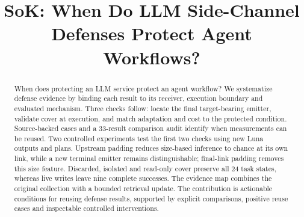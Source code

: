 \documentclass[conference,compsoc]{IEEEtran}
\title{SoK: When Do LLM Side-Channel Defenses Protect Agent Workflows?}
\author{}
\begin{document}
\maketitle

\begin{abstract}
When does protecting an LLM service protect an agent workflow? We systematize defense evidence by binding each result to its receiver, execution boundary and evaluated mechanism. Three checks follow: locate the final target-bearing emitter, validate cover at execution, and match adaptation and cost to the protected condition. Source-backed cases and a 33-result comparison audit identify when measurements can be reused. Two controlled experiments test the first two checks using new Luna outputs and plans. Upstream padding reduces size-based inference to chance at its own link, while a new terminal emitter remains distinguishable; final-link padding removes this size feature. Discarded, isolated and read-only cover preserve all 24 task states, whereas live writes leave nine complete successes. The evidence map combines the original collection with a bounded retrieval update. The contribution is actionable conditions for reusing defense results, supported by explicit comparisons, positive reuse cases and inspectable controlled interventions.
\end{abstract}












\clearpage
\appendices



\clearpage


\end{document}
